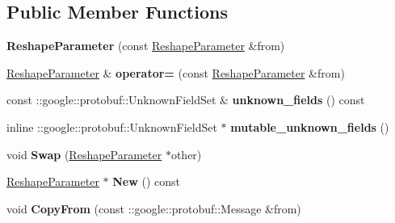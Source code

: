 \subsection*{Public Member Functions}
\begin{DoxyCompactItemize}
\item 
\mbox{\label{classcaffe_1_1_reshape_parameter_a23753d8a98e1c114a1905aa60218b517}} 
{\bfseries Reshape\+Parameter} (const \mbox{\hyperlink{classcaffe_1_1_reshape_parameter}{Reshape\+Parameter}} \&from)
\item 
\mbox{\label{classcaffe_1_1_reshape_parameter_abb4fa0c7b839c2965c1f69db747d33f2}} 
\mbox{\hyperlink{classcaffe_1_1_reshape_parameter}{Reshape\+Parameter}} \& {\bfseries operator=} (const \mbox{\hyperlink{classcaffe_1_1_reshape_parameter}{Reshape\+Parameter}} \&from)
\item 
\mbox{\label{classcaffe_1_1_reshape_parameter_ad4219f882f07a1e92c05ce1ca8eb06f9}} 
const \+::google\+::protobuf\+::\+Unknown\+Field\+Set \& {\bfseries unknown\+\_\+fields} () const
\item 
\mbox{\label{classcaffe_1_1_reshape_parameter_a5810cb62226d2dc70bd752642dd727d0}} 
inline \+::google\+::protobuf\+::\+Unknown\+Field\+Set $\ast$ {\bfseries mutable\+\_\+unknown\+\_\+fields} ()
\item 
\mbox{\label{classcaffe_1_1_reshape_parameter_ae485cd6bd0abd36cf0d106f3c32a9508}} 
void {\bfseries Swap} (\mbox{\hyperlink{classcaffe_1_1_reshape_parameter}{Reshape\+Parameter}} $\ast$other)
\item 
\mbox{\label{classcaffe_1_1_reshape_parameter_ac7b0684ba68267b64f8cb75eb2701345}} 
\mbox{\hyperlink{classcaffe_1_1_reshape_parameter}{Reshape\+Parameter}} $\ast$ {\bfseries New} () const
\item 
\mbox{\label{classcaffe_1_1_reshape_parameter_afd57bdc01465ccef80a1a9266c6af45a}} 
void {\bfseries Copy\+From} (const \+::google\+::protobuf\+::\+Message \&from)
\item 
\mbox{\label{classcaffe_1_1_reshape_parameter_a3190c6433d0d3a7334c741422d61c79a}} 

\end{DoxyCompactItemize}
